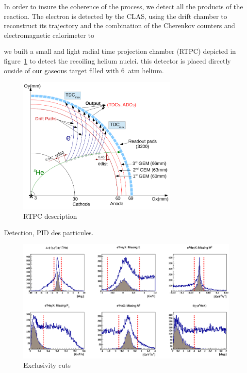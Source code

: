 \documentclass[%
 reprint,
 amsmath,amssymb,
 aps,
]{revtex4-1}
\begin{document}
In order to insure the coherence of the process, we detect all the products
of the reaction. The electron is detected by the CLAS, using the drift chamber 
to reconstruct its trajectory and the combination of the Cherenkov counters
and electromagnetic calorimeter to 

we built a small and light 
radial time projection chamber (RTPC) depicted in figure~\ref{fig:rtpc} to 
detect the recoiling helium nuclei. this detector is placed directly ouside of 
our gaseous target filled with 6~atm helium. 

\begin{figure}[htbp]
\caption{\label{fig:rtpc} RTPC description}
\includegraphics[width=8cm]{RTPC.png}
\end{figure}


Detection, PID des particules.

\begin{figure}[htbp]
\caption{\label{fig:exclu} Exclusivity cuts}
\includegraphics[width=17.2cm]{all_coh_exc_cuts.png}
\end{figure}
\end{document}
